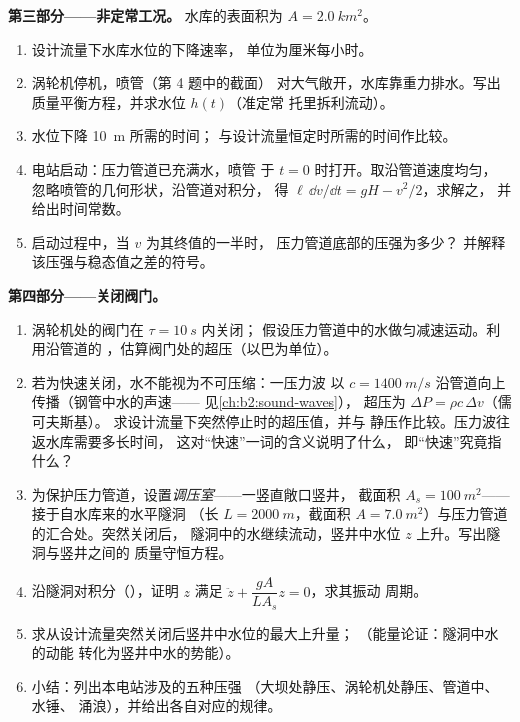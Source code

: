 \begin{problem}
\medskip
\noindent\textbf{第三部分——非定常工况。}
水库的表面积为 $A = \qty{2.0}{km^2}$。
\begin{enumerate}[resume]
  \item 设计流量下水库水位的下降速率，
        单位为厘米每小时。
  \item 涡轮机停机，喷管（第 4 题中的截面）
        对大气敞开，水库靠重力排水。写出
        质量平衡方程，并求水位 $h(t)$（准定常
        托里拆利流动）。
  \item 水位下降 \qty{10}{m} 所需的时间；
        与设计流量恒定时所需的时间作比较。
  \item 电站启动：压力管道已充满水，喷管
        于 $t = 0$ 时打开。取沿管道速度均匀，
        忽略喷管的几何形状，沿管道对积分，
        得 $\ell\,\dd v/\dd t = gH - v^2/2$，求解之，
        并给出时间常数。
  \item 启动过程中，当 $v$ 为其终值的一半时，
        压力管道底部的压强为多少？
        并解释该压强与稳态值之差的符号。
\end{enumerate}

\medskip
\noindent\textbf{第四部分——关闭阀门。}
\begin{enumerate}[resume]
  \item 涡轮机处的阀门在 $\tau = \qty{10}{s}$ 内关闭；
        假设压力管道中的水做匀减速运动。利用沿管道的
        ，估算阀门处的超压（以巴为单位）。
  \item 若为快速关闭，水不能视为不可压缩：一压力波
        以 $c = \qty{1400}{m/s}$ 沿管道向上传播（钢管中水的声速——
        见\cref{ch:b2:sound-waves}），
        超压为 $\Delta P = \rho c\,\Delta v$（儒可夫斯基）。
        求设计流量下突然停止时的超压值，并与
        静压作比较。压力波往返水库需要多长时间，
        这对“快速”一词的含义说明了什么，
        即“快速”究竟指什么？
  \item 为保护压力管道，设置\emph{调压室}——一竖直敞口竖井，
        截面积 $A_s = \qty{100}{m^2}$——接于自水库来的水平隧洞
        （长 $L = \qty{2000}{m}$，截面积 $A =
        \qty{7.0}{m^2}$）与压力管道的汇合处。突然关闭后，
        隧洞中的水继续流动，竖井中水位
        $z$ 上升。写出隧洞与竖井之间的
        质量守恒方程。
  \item 沿隧洞对积分（），证明
        $z$ 满足 $\ddot z + \dfrac{gA}{LA_s}z = 0$，求其振动
        周期。
  \item 求从设计流量突然关闭后竖井中水位的最大上升量；
        （能量论证：隧洞中水的动能
        转化为竖井中水的势能）。
  \item 小结：列出本电站涉及的五种压强
        （大坝处静压、涡轮机处静压、管道中、水锤、
        涌浪），并给出各自对应的规律。
\end{enumerate}
\end{problem}
